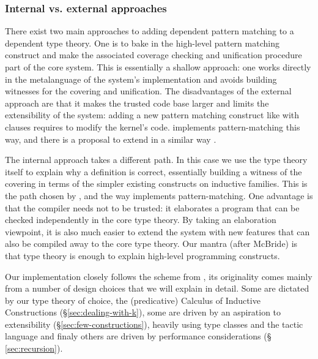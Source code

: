\vspace{-1em}

\subsubsection{Internal vs. external approaches}
\label{sec:intern-vs.-extern}

There exist two main approaches to adding dependent pattern matching to
a dependent type theory. One is to bake in the high-level pattern
matching construct and make the associated coverage checking and 
unification procedure part of the core system. This is essentially a
shallow approach: one works directly in the metalanguage of the 
system's implementation and avoids building witnesses for the covering
and unification. The disadvantages of the external approach are that
it makes the trusted code base larger and limits the extensibility of 
the system: adding a new pattern matching construct like with clauses 
requires to modify the kernel's code. \Agda implements pattern-matching
this way, and there is a proposal to extend \Coq in a similar way
\cite{conf/types/BarrasCGHS08}. 

The internal approach takes a different path. In this case we use the 
type theory itself to explain why a definition is correct,
essentially building a witness of the covering in terms of the 
simpler existing constructs on inductive families. This is the path 
chosen by \cite{DBLP:conf/birthday/GoguenMM06}, and the way \Epigram
implements pattern-matching. One advantage is that the compiler needs
not to be trusted: it elaborates a program that can be checked
independently in the core type theory. By taking an elaboration
viewpoint, it is also much easier to extend the system with new features
that can also be compiled away to the core type theory. Our 
mantra (after McBride) is that type theory is enough to explain
high-level programming constructs. 

Our implementation closely follows the scheme from
\cite*{DBLP:conf/birthday/GoguenMM06}, its originality comes mainly from
a number of design choices that we will explain in detail. Some are
dictated by our type theory of choice, the (predicative) Calculus of
Inductive Constructions (\S \ref{sec:dealing-with-k}), some are driven
by an aspiration to extensibility (\S \ref{sec:few-constructions}), 
heavily using type classes \cite{sozeau.Coq/classes/fctc} and the tactic
language and finaly others are driven by performance considerations (\S
\ref{sec:recursion}). 

